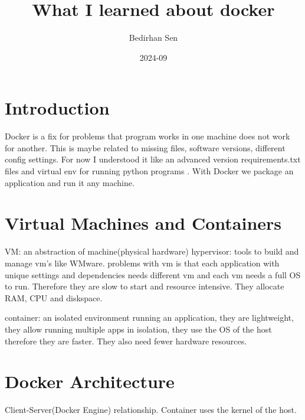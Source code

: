 \documentclass{article}
\title{What I learned about docker}
\date{2024-09}
\author{Bedirhan Sen}
\begin{document}
  \maketitle
  \newpage
  
  \section{Introduction}
Docker is a fix for problems that program works in one machine does not work for another. This is maybe related to missing files, software versions, different config settings. For now I understood it like an advanced version requirements.txt files and virtual env for running python programs . With Docker we package an application and run it any machine.

\section{Virtual Machines and Containers}
VM: an abstraction of machine(physical hardware)
hypervisor: tools to build and manage vm's like WMware.
problems with vm is that each application with unique settings and dependencies needs different vm and each vm needs a full OS to run. Therefore they are slow to start and resource intensive. They allocate RAM, CPU and diskspace.

container: an isolated environment running an application, they are lightweight, they allow running multiple apps in isolation, they use the OS of the host therefore they are faster. They also need fewer hardware resources. 

\section{Docker Architecture}
Client-Server(Docker Engine) relationship. Container uses the kernel of the host. 
\end{document}
